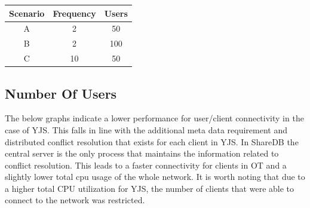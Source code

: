 \documentclass[12pt]{article}
\begin{document}
  \begin{tabular}{||c c c||} 
    \hline
    Scenario & Frequency & Users \\ [0.5ex] 
    \hline\hline
    A & 2 & 50 \\ 
    \hline
    B & 2 & 100 \\
    \hline
    C & 10 & 50 \\
    \hline
  \end{tabular}

  \subsection{Number Of Users}
  The below graphs indicate a lower performance for user/client connectivity in the case of YJS.
  This falls in line with the additional meta data requirement and distributed conflict resolution that exists for each client in YJS.
  In ShareDB the central server is the only process that maintains the information related to conflict resolution.
  This leads to a faster connectivity for clients in OT and a slightly lower total cpu usage of the whole network.
  It is worth noting that due to a higher total CPU utilization for YJS, the number of clients that were able to 
  connect to the network was restricted. 
\end{document}
